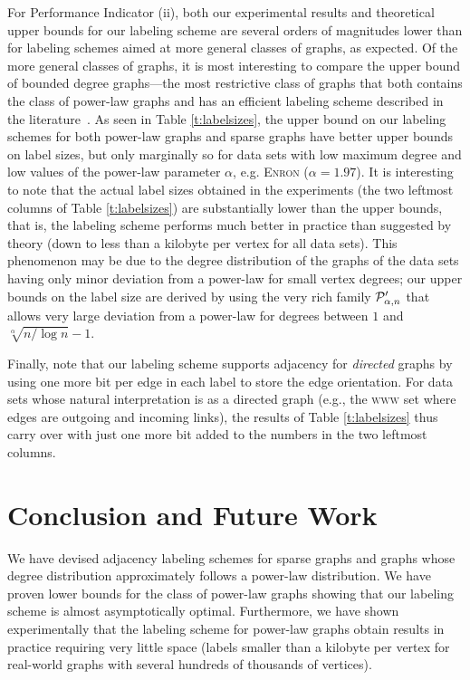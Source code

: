 For Performance Indicator (ii), both our experimental results and theoretical upper bounds for our labeling scheme are several orders of magnitudes lower than for labeling schemes aimed at more general classes of graphs, as expected. Of the more general classes of graphs, it is most interesting to compare the upper bound of bounded degree graphs---the most restrictive class of graphs that both contains the class of power-law graphs and has an efficient labeling scheme described in the literature~\cite{adjiashvili2014labeling}. As seen in Table \ref{t:labelsizes}, the upper bound on our labeling schemes for both power-law graphs and sparse graphs have better upper bounds on label sizes, but only marginally so for data sets with low maximum degree and low values of the power-law parameter $\alpha$, e.g. \textsc{Enron} ($\alpha = 1.97$). 
It is interesting to note that the actual label sizes obtained in the experiments (the two leftmost columns of Table \ref{t:labelsizes}) are substantially lower than the upper bounds, that is,
the labeling scheme performs much better in practice than suggested by theory (down to less than a kilobyte per vertex for all data sets). This phenomenon may be due to the degree distribution of the graphs of the data sets having only minor deviation from a power-law for small vertex degrees; our upper bounds on the label size are derived by using the very rich family $ \mathcal{P}'_{\alpha,n}$ that allows very large deviation from a power-law for degrees between $1$ and $\sqrt[\alpha]{n/\log n} - 1$.

Finally, note that our labeling scheme supports adjacency for \emph{directed} graphs by using one more bit per edge in each label to store the edge orientation. For data sets whose natural interpretation is as a directed graph (e.g., the \textsc{www} set where edges are outgoing and incoming links), the results of Table \ref{t:labelsizes} thus carry over with just one more bit
added to the numbers in the two leftmost columns.

\section{Conclusion and Future Work}

We have devised adjacency labeling schemes for sparse graphs and graphs whose degree distribution approximately follows a power-law distribution. We have proven lower bounds for the class of power-law graphs showing that our labeling scheme is  almost asymptotically optimal. Furthermore, we have shown experimentally that the labeling scheme for power-law graphs obtain
results in practice requiring very little space (labels smaller than a kilobyte per vertex for real-world graphs with several hundreds of thousands of vertices).


